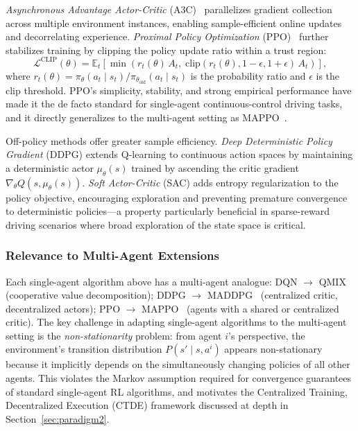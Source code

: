 \documentclass[12pt, a4paper]{article}
\begin{document}
\emph{Asynchronous Advantage Actor-Critic} (A3C)~\cite{mnih2016asynchronous}
parallelizes gradient collection across multiple environment instances, enabling
sample-efficient online updates and decorrelating experience.  \emph{Proximal
Policy Optimization} (PPO)~\cite{schulman2017proximal} further stabilizes
training by clipping the policy update ratio within a trust region:
\[
  \mathcal{L}^{\text{CLIP}}(\theta) = \mathbb{E}_t\!\left[
    \min\!\left(r_t(\theta)\, A_t,\;
    \mathrm{clip}(r_t(\theta), 1{-}\epsilon, 1{+}\epsilon)\, A_t\right)\right],
\]
where $r_t(\theta) = \pi_\theta(a_t \mid s_t) / \pi_{\theta_{\text{old}}}(a_t \mid s_t)$
is the probability ratio and $\epsilon$ is the clip threshold.  PPO's
simplicity, stability, and strong empirical performance have made it the
de facto standard for single-agent continuous-control driving tasks, and it
directly generalizes to the multi-agent setting as MAPPO~\cite{yu2021surprising}.

Off-policy methods offer greater sample efficiency.  \emph{Deep Deterministic
Policy Gradient} (DDPG) extends Q-learning to continuous action spaces by
maintaining a deterministic actor $\mu_\theta(s)$ trained by ascending the
critic gradient $\nabla_\theta Q(s, \mu_\theta(s))$.  \emph{Soft Actor-Critic}
(SAC) adds entropy regularization to the policy objective, encouraging
exploration and preventing premature convergence to deterministic policies---a
property particularly beneficial in sparse-reward driving scenarios where
broad exploration of the state space is critical.

\subsubsection*{Relevance to Multi-Agent Extensions}

Each single-agent algorithm above has a multi-agent analogue:
DQN $\to$ QMIX~\cite{rashid2018qmix} (cooperative value decomposition);
DDPG $\to$ MADDPG~\cite{lowe2017multi} (centralized critic, decentralized
actors); PPO $\to$ MAPPO~\cite{yu2021surprising} (agents with a shared or
centralized critic).  The key challenge in adapting single-agent algorithms
to the multi-agent setting is the \emph{non-stationarity} problem: from
agent $i$'s perspective, the environment's transition distribution
$P(s' \mid s, a^i)$ appears non-stationary because it implicitly depends on
the simultaneously changing policies of all other agents.  This violates the
Markov assumption required for convergence guarantees of standard single-agent
RL algorithms, and motivates the Centralized Training, Decentralized Execution
(CTDE) framework discussed at depth in Section~\ref{sec:paradigm2}.
\end{document}
